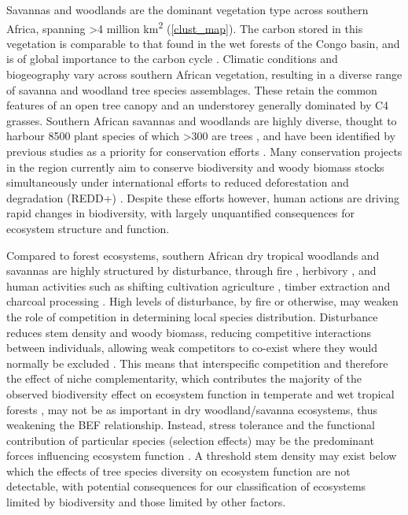 \documentclass[11pt,a4paper]{article}
\newcommand{\textapprox}{\raisebox{0.5ex}{\texttildelow}}  %
\begin{document}
Savannas and woodlands are the dominant vegetation type across southern Africa, spanning >4 million km\textsuperscript{2} \citep{White1987, Ratnam2011, Ryan2016} (\autoref{clust_map}). The carbon stored in this vegetation is comparable to that found in the wet forests of the Congo basin, and is of global importance to the carbon cycle \citep{Houghton2009, Mayaux2008}. Climatic conditions and biogeography vary across southern African vegetation, resulting in a diverse range of savanna and woodland tree species assemblages. These retain the common features of an open tree canopy and an understorey generally dominated by C4 grasses. Southern African savannas and woodlands are highly diverse, thought to harbour \textapprox{}8500 plant species of which >300 are trees \citep{Frost1996}, and have been identified by previous studies as a priority for conservation efforts \citep{Byers2001, Mittermeier2003}. Many conservation projects in the region currently aim to conserve biodiversity and woody biomass stocks simultaneously under international efforts to reduced deforestation and degradation (REDD+) \citep{Hinsley2015}. Despite these efforts however, human actions are driving rapid changes in biodiversity, with largely unquantified consequences for ecosystem structure and function.

Compared to forest ecosystems, southern African dry tropical woodlands and savannas are highly structured by disturbance, through fire \citep{Lehmann2014}, herbivory \citep{Sankaran2008, Levick2009}, and human activities such as shifting cultivation agriculture \citep{Heinimann2017}, timber extraction and charcoal processing \citep{Dewees2010, McNicol2018b}. High levels of disturbance, by fire or otherwise, may weaken the role of competition in determining local species distribution. Disturbance reduces stem density and woody biomass, reducing competitive interactions between individuals, allowing weak competitors to co-exist where they would normally be excluded \citep{Grime1979, Grace1990}. This means that interspecific competition and therefore the effect of niche complementarity, which contributes the majority of the observed biodiversity effect on ecosystem function in temperate and wet tropical forests \citep{Wright2017, Poorter2015, Sande2017a}, may not be as important in dry woodland/savanna ecosystems, thus weakening the BEF relationship. Instead, stress tolerance and the functional contribution of particular species (selection effects) may be the predominant forces influencing ecosystem function \citep{Lasky2014, Tobner2016}. A threshold stem density may exist below which the effects of tree species diversity on ecosystem function are not detectable, with potential consequences for our classification of ecosystems limited by biodiversity and those limited by other factors.
\end{document}

